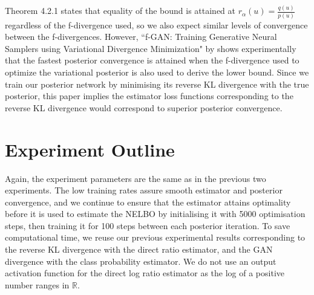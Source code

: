\documentclass[honours,12pt]{unswthesis}
\newcommand{\R}{\mathbb{R}}
\numberwithin{equation}{section}
\theoremstyle{definition}
\begin{document}
Theorem 4.2.1 states that equality of the bound is attained at $r_\alpha(u)=\frac{q(u)}{p(u)}$ regardless of the f-divergence used, so we also expect similar levels of convergence between the f-divergences. However, ``f-GAN: Training Generative Neural Samplers using Variational Divergence Minimization" by \citet{nowozin} shows experimentally that the fastest posterior convergence is attained when the f-divergence used to optimize the variational posterior is also used to derive the lower bound. Since we train our posterior network by minimising its reverse KL divergence with the true posterior, this paper implies the estimator loss functions corresponding to the reverse KL divergence would correspond to superior posterior convergence.
\section{Experiment Outline}
Again, the experiment parameters are the same as in the previous two experiments. The low training rates assure smooth estimator and posterior convergence, and we continue to ensure that the estimator attains optimality before it is used to estimate the NELBO by initialising it with 5000 optimisation steps, then training it for 100 steps between each posterior iteration. To save computational time, we reuse our previous experimental results corresponding to the reverse KL divergence with the direct ratio estimator, and the GAN divergence with the class probability estimator. We do not use an output activation function for the direct log ratio estimator as the log of a positive number ranges in $\R$.
\end{document}
